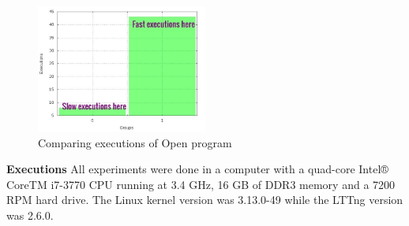      \begin{figure}[h]
      \centering
        \includegraphics[width=0.50\textwidth]{figures/grouping.jpg}
        \caption{Comparing executions of Open program}
        \label{fig:group}
    \end{figure}

    
    
\textbf{Executions}
    All experiments were done in a computer with a quad-core Intel® CoreTM i7-3770 CPU running at 3.4 GHz, 16 GB of DDR3 memory and a 7200 RPM hard drive. The Linux kernel version was 3.13.0-49 while the LTTng version was 2.6.0.
  
    
    

